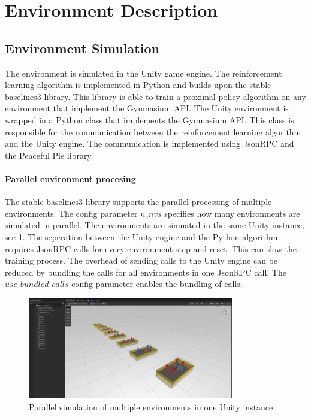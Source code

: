 \section{Environment Description}
\label{cha:env_description}

\subsection{Environment Simulation}
\label{sec:env_simulation}

The environment is simulated in the Unity game engine. The reinforcement learning algorithm is implemented in Python and builds upon the stable-baselines3 library. This library is able to train a proximal policy algorithm on any environment that implement the Gymnasium API. The Unity environment is wrapped in a Python class that implements the Gymnasium API. This class is responsible for the communication between the reinforcement learning algorithm and the Unity engine. The communication is implemented using JsonRPC and the Peaceful Pie \autocite{peacefulpie} library.

\paragraph{Parallel environment procesing} The stable-baselines3 library supports the parallel processing of multiple environments. The config parameter $n_envs$ specifies how many environments are simulated in parallel. The environments are simuated in the same Unity instance, see \ref{fig:parallel_simulation_unity_instance}. The seperation between the Unity engine and the Python algorithm requires JsonRPC calls for every environment step and reset. This can slow the training process. The overhead of sending calls to the Unity engine can be reduced by bundling the calls for all environments in one JsonRPC call. The $use\_bundled\_calls$ config parameter enables the bundling of calls.

\begin{figure}
    \centering
    \includegraphics[width=0.8\textwidth]{Bilder/parallel_simulation_unity_instance.png}
    \caption{Parallel simulation of multiple environments in one Unity instance}
    \label{fig:parallel_simulation_unity_instance}
\end{figure}


